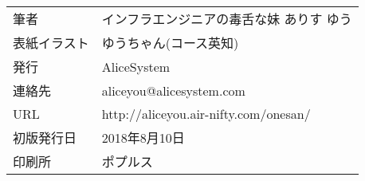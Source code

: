 \thispagestyle{empty}
\mbox{}
\newpage
\clearpage


\thispagestyle{empty}

\vspace*{\fill}
\begin{tabular}{ll} \toprule
筆者 & インフラエンジニアの毒舌な妹 ありす ゆう \\
表紙イラスト & ゆうちゃん(コース英知) \\
発行 & AliceSystem \\
連絡先 & aliceyou@alicesystem.com \\
URL & http://aliceyou.air-nifty.com/onesan/ \\
初版発行日 & 2018年8月10日 \\
印刷所 & ポプルス \\ \bottomrule
\end{tabular}